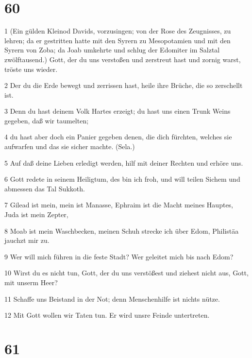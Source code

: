\chapter{60}

\par 1 (Ein gülden Kleinod Davids, vorzusingen; von der Rose des Zeugnisses, zu lehren; da er gestritten hatte mit den Syrern zu Mesopotamien und mit den Syrern von Zoba; da Joab umkehrte und schlug der Edomiter im Salztal zwölftausend.) Gott, der du uns verstoßen und zerstreut hast und zornig warst, tröste uns wieder.
\par 2 Der du die Erde bewegt und zerrissen hast, heile ihre Brüche, die so zerschellt ist.
\par 3 Denn du hast deinem Volk Hartes erzeigt; du hast uns einen Trunk Weins gegeben, daß wir taumelten;
\par 4 du hast aber doch ein Panier gegeben denen, die dich fürchten, welches sie aufwarfen und das sie sicher machte. (Sela.)
\par 5 Auf daß deine Lieben erledigt werden, hilf mit deiner Rechten und erhöre uns.
\par 6 Gott redete in seinem Heiligtum, des bin ich froh, und will teilen Sichem und abmessen das Tal Sukkoth.
\par 7 Gilead ist mein, mein ist Manasse, Ephraim ist die Macht meines Hauptes, Juda ist mein Zepter,
\par 8 Moab ist mein Waschbecken, meinen Schuh strecke ich über Edom, Philistäa jauchzt mir zu.
\par 9 Wer will mich führen in die feste Stadt? Wer geleitet mich bis nach Edom?
\par 10 Wirst du es nicht tun, Gott, der du uns verstößest und ziehest nicht aus, Gott, mit unserm Heer?
\par 11 Schaffe uns Beistand in der Not; denn Menschenhilfe ist nichts nütze.
\par 12 Mit Gott wollen wir Taten tun. Er wird unsre Feinde untertreten.

\chapter{61}

